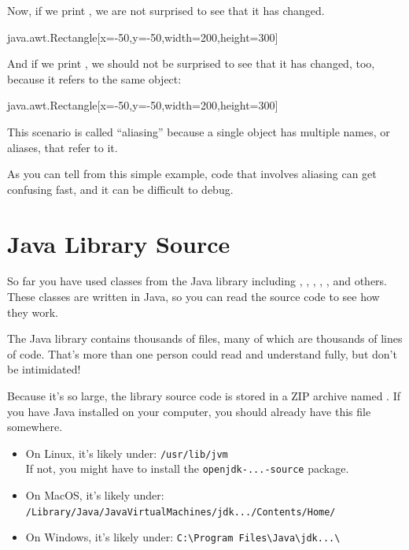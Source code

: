 Now, if we print , we are not surprised to see that it has changed.

\begin{code}
java.awt.Rectangle[x=-50,y=-50,width=200,height=300]
\end{code}

And if we print , we should not be surprised to see that it has changed, too, because it refers to the same object:

\begin{code}
java.awt.Rectangle[x=-50,y=-50,width=200,height=300]
\end{code}

This scenario is called ``aliasing'' because a single object has multiple names, or aliases, that refer to it.

As you can tell from this simple example, code that involves aliasing can get confusing fast, and it can be difficult to debug.


\section{Java Library Source}
\label{src.zip}


So far you have used classes from the Java library including , , , , , and others.
These classes are written in Java, so you can read the source code to see how they work.


The Java library contains thousands of files, many of which are thousands of lines of code.
That's more than one person could read and understand fully, but don't be intimidated!

Because it's so large, the library source code is stored in a ZIP archive named .
If you have Java installed on your computer, you should already have this file somewhere.

\begin{itemize}
\item On Linux, it's likely under: \verb"/usr/lib/jvm"
\\ If not, you might have to install the {\tt openjdk-...-source} package.

\item On MacOS, it's likely under: \\ \verb"/Library/Java/JavaVirtualMachines/jdk.../Contents/Home/"

\item On Windows, it's likely under: \verb"C:\Program Files\Java\jdk...\"
\end{itemize}

